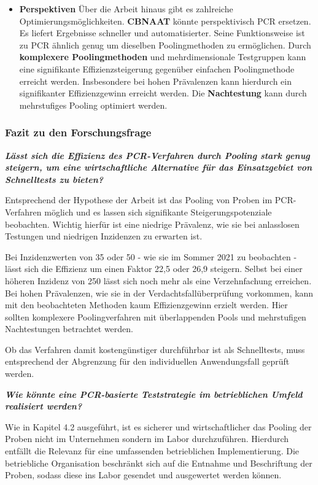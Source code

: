 \begin{itemize}
\cleardoublepage
	
	\item \textbf{Perspektiven} Über die Arbeit hinaus gibt es zahlreiche Optimierungsmöglichkeiten.
	\textbf{CBNAAT} könnte perspektivisch PCR ersetzen. Es liefert Ergebnisse schneller und automatisierter. Seine Funktionsweise ist zu PCR ähnlich genug um dieselben Poolingmethoden zu ermöglichen.
	Durch \textbf{komplexere Poolingmethoden} und mehrdimensionale Testgruppen kann eine signifikante Effizienzsteigerung gegenüber einfachen Poolingmethode erreicht werden.
	Insbesondere bei hohen Prävalenzen kann hierdurch ein signifikanter Effizienzgewinn erreicht werden.
	Die \textbf{Nachtestung} kann durch mehrstufiges Pooling optimiert werden.
\end{itemize}

\subsubsection{Fazit zu den Forschungsfrage}
\textit{\textbf{Lässt sich die Effizienz des PCR-Verfahren durch Pooling stark genug steigern, um eine wirtschaftliche Alternative für das Einsatzgebiet von Schnelltests zu bieten?}}

Entsprechend der Hypothese der Arbeit ist das Pooling von Proben im PCR-Verfahren möglich und es lassen sich signifikante Steigerungspotenziale beobachten.
Wichtig hierfür ist eine niedrige Prävalenz, wie sie bei anlasslosen Testungen und niedrigen Inzidenzen zu erwarten ist.

Bei Inzidenzwerten von 35 oder 50 - wie sie im Sommer 2021 zu beobachten - lässt sich die Effizienz um einen Faktor 22,5 oder 26,9 steigern. Selbst bei einer höheren Inzidenz von 250 lässt sich noch mehr als eine Verzehnfachung erreichen.
Bei hohen Prävalenzen, wie sie in der Verdachtsfallüberprüfung vorkommen, kann mit den beobachteten Methoden kaum Effizienzgewinn erzielt werden. Hier sollten komplexere Poolingverfahren mit überlappenden Pools und mehrstufigen Nachtestungen betrachtet werden.

Ob das Verfahren damit kostengünstiger durchführbar ist als Schnelltests, muss entsprechend der Abgrenzung für den individuellen Anwendungsfall geprüft werden.

\textit{\textbf{Wie könnte eine PCR-basierte Teststrategie im betrieblichen Umfeld realisiert werden?}}

Wie in Kapitel 4.2 ausgeführt, ist es sicherer und wirtschaftlicher das Pooling der Proben nicht im Unternehmen sondern im Labor durchzuführen.
Hierdurch entfällt die Relevanz für eine umfassenden betrieblichen Implementierung.
Die betriebliche Organisation beschränkt sich auf die Entnahme und Beschriftung der Proben, sodass diese ins Labor gesendet und ausgewertet werden können.